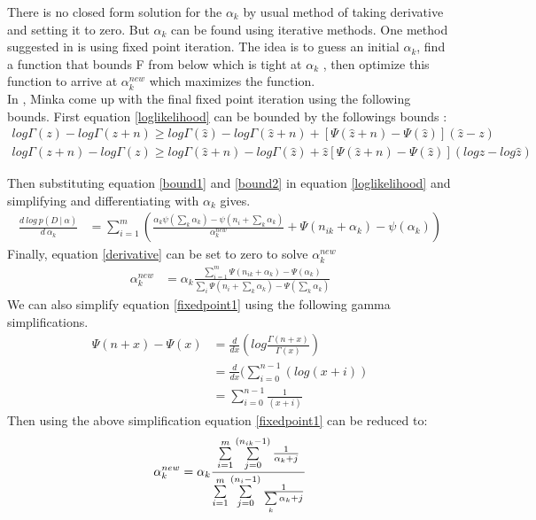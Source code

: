 \documentclass{article} %
\newcommand{\?}{\stackrel{?}{=}}
\begin{document}
There is no closed form solution for the $\alpha_k$ by usual method of taking derivative and setting it to zero. But $\alpha_k$ can be found using iterative methods. One method suggested in \cite{minka} is using fixed point iteration. The idea is to guess an initial $\alpha_k$, find a function that bounds F from below which is tight at $\alpha_k$ , then optimize this function to arrive at $\alpha_k^{new}$ which maximizes the function.\\
In \cite{minka}, Minka come up with the final fixed point iteration using the following bounds. First equation \ref{loglikelihood} can be bounded by the followings bounds \cite{Guo76}:
\begin{align}
log \Gamma(z) -log\Gamma(z+n) \geq log\Gamma(\hat{z}) - log\Gamma(\hat{z}+n) + [\Psi(\hat{z}+n)-\Psi(\hat{z})](\hat{z}-z)\label{bound1} \\
log \Gamma(z+n) -log\Gamma(z) \geq log\Gamma(\hat{z}+n) - log\Gamma(\hat{z}) + \hat{z}[\Psi(\hat{z}+n)-\Psi(\hat{z})](log z - log \hat{z})\label{bound2}
\end{align}

Then substituting equation \ref{bound1} and \ref{bound2} in equation \ref{loglikelihood} and simplifying and differentiating with $\alpha_k$ gives.
\begin{align}
\frac{d\ log\ p(D\ |\ \alpha)}{d\ \alpha_k} &= 
\sum_{i=1}^{m} \left(\frac{\alpha_k{ \psi(\sum_{k}\alpha_k) - \psi(n_i+\sum_{k}\alpha_k)  }}{\alpha_{k}^{new}} +\Psi(n_{ik} + \alpha_k) - \psi(\alpha_k)\right)\label{derivative}
\end{align}
Finally, equation \ref{derivative} can be set to zero to solve $\alpha_{k}^{new}$
\begin{align}
\alpha_k^{new} &= \alpha_k \frac{\sum\limits_{i=1}^{m}\Psi(n_{ik}+\alpha_k)- \Psi(\alpha_k)}{\sum\limits_{i}\Psi(n_i +\sum\limits_k \alpha_k) - \Psi(\sum\limits_k \alpha_k)}\label{fixedpoint1}
\end{align}
We can also simplify equation \ref{fixedpoint1} using the following gamma simplifications.
\begin{align}
\Psi(n+x)-\Psi(x) &= \frac{d}{dx}(log\frac{ \Gamma(n+x)}{\Gamma(x)})\\
&=\frac{d}{dx}(\sum\limits_{i=0}^{n-1}( log (x+i))\\
&=\sum\limits_{i=0}^{n-1}\frac{1}{(x+i)}
\end{align}
Then using the above simplification equation \ref{fixedpoint1} can be reduced to:
\begin{align}
\alpha_k^{new} &= \alpha_k \frac{\sum\limits_{i=1}^{m}  \sum\limits_{j=0}^{(n_{ik}-1)}\frac{1}{\alpha_k +j}}{\sum\limits_{i=1}^{m}\sum\limits\limits_{j=0}^{(n_{i}-1)}\frac{1}{\sum\limits_k \alpha_k +j}}\\
\end{align}
\end{document}
